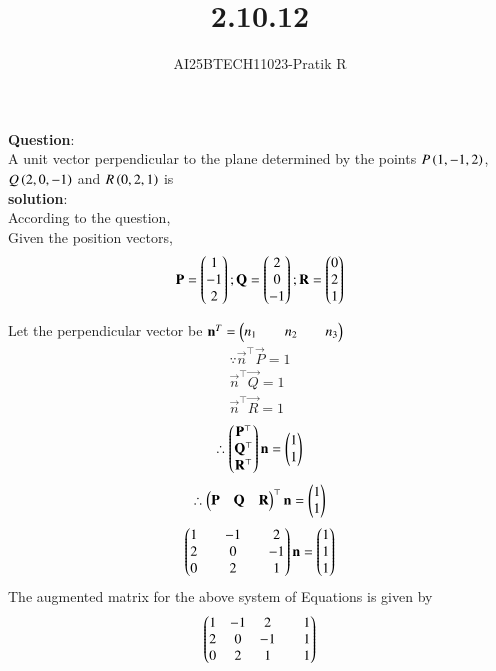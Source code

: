 \documentclass[journal]{IEEEtran}
\begin{document}

\vspace{3cm}

\title{2.10.12}
\author{AI25BTECH11023-Pratik R}
 \maketitle
{\let\newpage\relax\maketitle}

\renewcommand{\thefigure}{\theenumi}
\renewcommand{\thetable}{\theenumi}
\setlength{\intextsep}{10pt} %


\renewcommand{\thetable}{\theenumi}

\textbf{Question}:\\
A unit vector perpendicular to the plane determined by the points
$P\left(1,-1,2\right)$,$Q\left(2,0,-1\right)$ and $R\left(0,2,1\right)$ is \\ 
\textbf{solution}: \\
According to the question, \\
Given the position vectors,
\begin{align}
    \mathbf{P}=\begin{pmatrix}1\\-1\\2\end{pmatrix};
    \mathbf{Q}=\begin{pmatrix}2\\0\\-1\end{pmatrix};
    \mathbf{R}=\begin{pmatrix}0\\2\\1\end{pmatrix}
\end{align}


Let the perpendicular vector be $\mathbf{n}^T=\begin{pmatrix}n_1&&n_2&&n_3\end{pmatrix}$
\begin{align}
    \because \vec{n}^\top \vec{P}=1\\
    \vec{n}^\top \vec{Q}=1 \\
    \vec{n}^\top \vec{R}=1
\end{align}
\begin{align}
    \therefore \begin{pmatrix}\mathbf{P}^\top \\\mathbf{Q}^\top \\\mathbf{R}^\top\end{pmatrix}\mathbf{n}= \begin{pmatrix}1 \\ 1\end{pmatrix}
\end{align}
\begin{align}
    \therefore \begin{pmatrix}\mathbf{P} & \mathbf{Q} & \mathbf{R}\end{pmatrix}^\top \mathbf{n}= \begin{pmatrix}1 \\ 1\end{pmatrix}
\end{align}
\begin{align}
    \begin{pmatrix}1&&-1&&2\\2&&0&&-1 \\ 0&&2&&1\end{pmatrix} \mathbf{n}= \begin{pmatrix}1 \\ 1 \\ 1\end{pmatrix}
\end{align}
The augmented matrix for the above system of Equations is given by
\begin{align}
    \begin{pmatrix}1&-1&2&&1\\2&0&-1&&1\\0&2&1&&1\end{pmatrix} 
\end{align}
\end{document}
